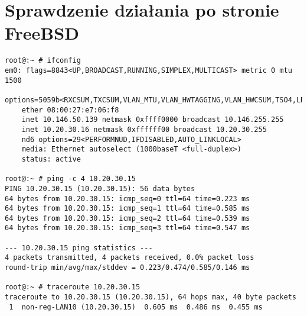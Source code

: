 \documentclass[a4paper,11pt]{article}
\begin{document}
\section{Sprawdzenie działania po stronie FreeBSD}

\begin{verbatim}
root@:~ # ifconfig
em0: flags=8843<UP,BROADCAST,RUNNING,SIMPLEX,MULTICAST> metric 0 mtu 1500
	options=5059b<RXCSUM,TXCSUM,VLAN_MTU,VLAN_HWTAGGING,VLAN_HWCSUM,TSO4,LRO,VLAN_HWFILTER,VLAN_HWTSO>
	ether 08:00:27:e7:06:f8
	inet 10.146.50.139 netmask 0xffff0000 broadcast 10.146.255.255
	inet 10.20.30.16 netmask 0xffffff00 broadcast 10.20.30.255 
	nd6 options=29<PERFORMNUD,IFDISABLED,AUTO_LINKLOCAL>
	media: Ethernet autoselect (1000baseT <full-duplex>)
	status: active

root@:~ # ping -c 4 10.20.30.15
PING 10.20.30.15 (10.20.30.15): 56 data bytes
64 bytes from 10.20.30.15: icmp_seq=0 ttl=64 time=0.223 ms
64 bytes from 10.20.30.15: icmp_seq=1 ttl=64 time=0.585 ms
64 bytes from 10.20.30.15: icmp_seq=2 ttl=64 time=0.539 ms
64 bytes from 10.20.30.15: icmp_seq=3 ttl=64 time=0.547 ms

--- 10.20.30.15 ping statistics ---
4 packets transmitted, 4 packets received, 0.0% packet loss
round-trip min/avg/max/stddev = 0.223/0.474/0.585/0.146 ms

root@:~ # traceroute 10.20.30.15
traceroute to 10.20.30.15 (10.20.30.15), 64 hops max, 40 byte packets
 1  non-reg-LAN10 (10.20.30.15)  0.605 ms  0.486 ms  0.455 ms
\end{verbatim}
\end{document}
